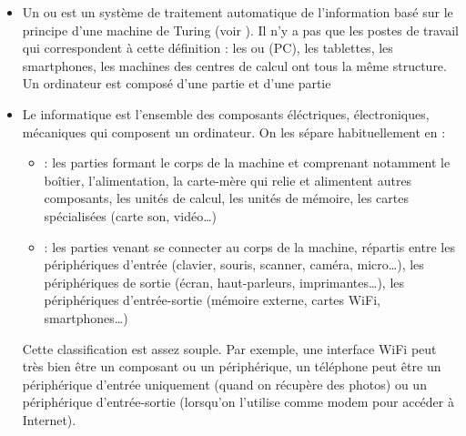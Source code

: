 \documentclass[10pt,a4paper]{report}
\begin{document}
\begin{itemize}
	\item Un  ou  est un système de traitement automatique de l'information basé sur le principe d'une machine de Turing (voir \autocite{MachineTuring2021}). Il n'y a pas que les postes de travail qui correspondent à cette définition : les  ou  (PC), les tablettes, les smartphones, les machines des centres de calcul ont tous la même structure. \\
		Un ordinateur est composé d'une partie  et d'une partie 
	\item Le  informatique est l'ensemble des composants éléctriques, électroniques, mécaniques qui composent un ordinateur. On les sépare habituellement en :
		\begin{itemize}
			\item {} : les parties formant le corps de la machine et comprenant notamment le boîtier, l'alimentation, la carte-mère qui relie et alimentent autres composants, les unités de calcul, les unités de mémoire, les cartes spécialisées (carte son, vidéo\dots)
			\item {} : les parties venant se connecter au corps de la machine, répartis entre les périphériques d'entrée (clavier, souris, scanner, caméra, micro\dots), les périphériques de sortie (écran, haut-parleurs, imprimantes\dots), les périphériques d'entrée-sortie (mémoire externe, cartes WiFi, smartphones\dots)
		\end{itemize}
		Cette classification est assez souple. Par exemple, une interface WiFi peut très bien être un composant ou un périphérique, un téléphone peut être un périphérique d'entrée uniquement (quand on récupère des photos) ou un périphérique d'entrée-sortie (lorsqu'on l'utilise comme modem pour accéder à Internet).
\end{itemize}
\end{document}
